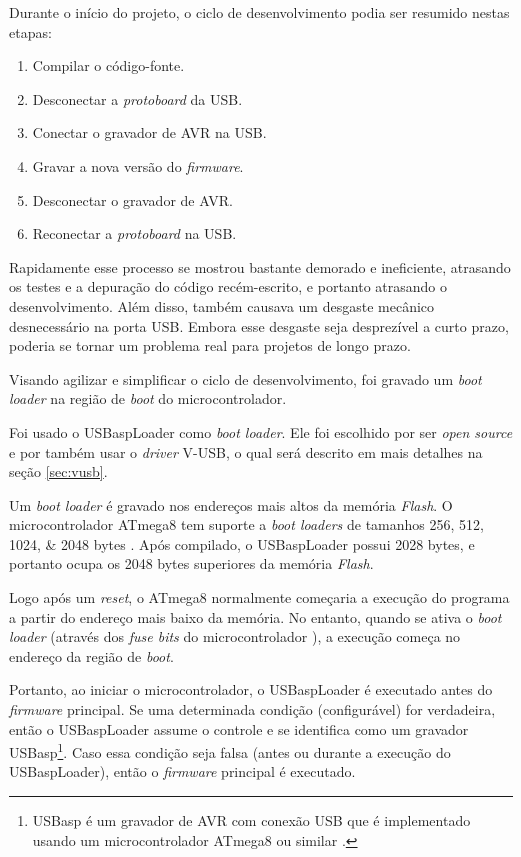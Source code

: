 \documentclass[brazil,pagestart=firstchapter]{abnt}
\newcommand*{\VUSB}{\mbox{V-USB}\xspace}
\begin{document}
Durante o início do projeto, o ciclo de desenvolvimento podia ser resumido
nestas etapas:

\begin{enumerate}
\item Compilar o código-fonte.
\item Desconectar a \textit{protoboard} da \ac{USB}.
\item Conectar o gravador de AVR na \ac{USB}.
\item Gravar a nova versão do \textit{firmware}.
\item Desconectar o gravador de AVR.
\item Reconectar a \textit{protoboard} na \ac{USB}.
\end{enumerate}

Rapidamente esse processo se mostrou bastante demorado e ineficiente,
atrasando os testes e a depuração do código recém-escrito, e portanto
atrasando o desenvolvimento. Além disso, também causava um desgaste mecânico
desnecessário na porta \ac{USB}. Embora esse desgaste seja desprezível a
curto prazo, poderia se tornar um problema real para projetos de longo
prazo.

Visando agilizar e simplificar o ciclo de desenvolvimento, foi gravado um
\textit{boot loader} na região de \textit{boot} do microcontrolador.

Foi usado o USBaspLoader \cite{USBaspLoader} como \textit{boot loader}. Ele
foi escolhido por ser \textit{open source} e por também usar o
\textit{driver} \VUSB, o qual será descrito em mais detalhes na seção
\ref{sec:vusb}.

Um \textit{boot loader} é gravado nos endereços mais altos da memória
\textit{Flash}. O microcontrolador ATmega8 tem suporte a \textit{boot
loaders} de tamanhos \numlist{256;512;1024;2048} bytes
\cite{ATmega8}. Após compilado, o USBaspLoader possui \num{2028}
bytes, e portanto ocupa os \num{2048} bytes superiores da memória
\textit{Flash}.

Logo após um \textit{reset}, o ATmega8 normalmente começaria a execução do
programa a partir do endereço mais baixo da memória. No entanto, quando se
ativa o \textit{boot loader} (através dos \textit{fuse bits} do
microcontrolador \cite{ATmega8}), a execução começa no endereço da
região de \textit{boot}.

Portanto, ao iniciar o microcontrolador, o USBaspLoader é executado antes do
\textit{firmware} principal. Se uma determinada condição (configurável) for
verdadeira, então o USBaspLoader assume o controle e se identifica como um
gravador USBasp\footnote{
	USBasp é um gravador de AVR com conexão USB que é implementado usando um
	microcontrolador ATmega8 ou similar \cite{USBasp}.
}.
Caso essa condição seja falsa (antes ou durante a execução do USBaspLoader),
então o \textit{firmware} principal é executado.
\end{document}
